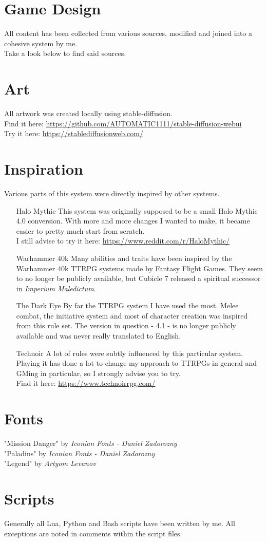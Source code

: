 \section*{Game Design}
All content has been collected from various sources, modified and joined into a cohesive system by me.\\
Take a look below to find said sources.

\section*{Art}
All artwork was created locally using stable-diffusion.\\
Find it here: \url{https://github.com/AUTOMATIC1111/stable-diffusion-webui}\\
Try it here: \url{https://stablediffusionweb.com/}

\section*{Inspiration}
Various parts of this system were directly inspired by other systems.
\begin{enumerate}
	\item[Halo Mythic] This system was originally supposed to be a small Halo Mythic 4.0 conversion. With more and more changes I wanted to make, it became easier to pretty much start from scratch.\\
		I still advise to try it here: \url{https://www.reddit.com/r/HaloMythic/}
	\item[Warhammer 40k] Many abilities and traits have been inspired by the Warhammer 40k TTRPG systems made by Fantasy Flight Games. They seem to no longer be publicly available, but Cubicle 7 released a spiritual successor in \emph{Imperium Maledictum}.
	\item[The Dark Eye] By far the TTRPG system I have used the most. Melee combat, the initiative system and most of character creation was inspired from this rule set. The version in question - 4.1 - is no longer publicly available and was never really translated to English.
	\item[Technoir] A lot of rules were subtly influenced by this particular system. Playing it has done a lot to change my approach to TTRPGs in general and GMing in particular, so I strongly advise you to try.\\
		Find it here: \url{https://www.technoirrpg.com/}
\end{enumerate}

\section*{Fonts}
"Mission Danger" by \textit{Iconian Fonts - Daniel Zadorozny}\\
"Paladins" by \textit{Iconian Fonts - Daniel Zadorozny}\\
"Legend" by \textit{Artyom Levanov}

\section*{Scripts}
Generally all Lua, Python and Bash scripts have been written by me. All exceptions are noted in comments within the script files.
